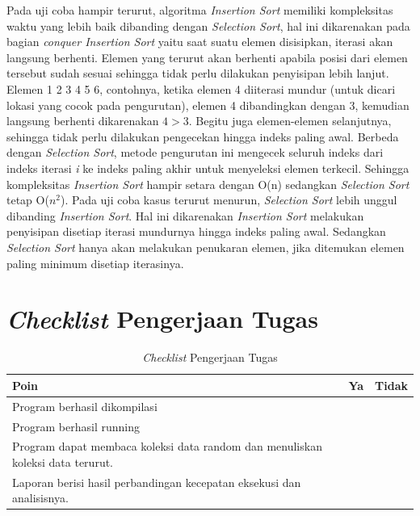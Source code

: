\documentclass{article}
\begin{document}
	\par Pada uji coba hampir terurut, algoritma \textit{Insertion Sort} memiliki kompleksitas waktu yang lebih baik dibanding dengan \textit{Selection Sort}, hal ini dikarenakan pada bagian \textit{conquer Insertion Sort} yaitu saat suatu elemen disisipkan, iterasi akan langsung berhenti. Elemen yang terurut akan berhenti apabila posisi dari elemen tersebut sudah sesuai sehingga tidak perlu dilakukan penyisipan lebih lanjut. Elemen 1 2 3 4 5 6, contohnya, ketika elemen 4 diiterasi mundur (untuk dicari lokasi yang cocok pada pengurutan), elemen 4 dibandingkan dengan 3, kemudian langsung berhenti dikarenakan $4>3$. Begitu juga elemen-elemen selanjutnya, sehingga tidak perlu dilakukan pengecekan hingga indeks paling awal. Berbeda dengan \textit{Selection Sort}, metode pengurutan ini mengecek seluruh indeks dari indeks iterasi \textit{i} ke indeks paling akhir untuk menyeleksi elemen terkecil. Sehingga kompleksitas \textit{Insertion Sort} hampir setara dengan O(n) sedangkan \textit{Selection Sort} tetap O($n^2$). Pada uji coba kasus terurut menurun, \textit{Selection Sort} lebih unggul dibanding \textit{Insertion Sort}. Hal ini dikarenakan \textit{Insertion Sort} melakukan penyisipan disetiap iterasi mundurnya hingga indeks paling awal. Sedangkan \textit{Selection Sort} hanya akan melakukan penukaran elemen, jika ditemukan elemen paling minimum disetiap iterasinya.
	
	
	
	\section{\textit{Checklist} Pengerjaan Tugas}
	\begin{table}[h]
		\caption{\textit{Checklist} Pengerjaan Tugas}
		\centering
		\begin{tabular}{|L|c|c|}
			\hline
			\centering Poin & Ya & Tidak \\
			\hline
			Program berhasil dikompilasi & \checkmark &  \\
			\hline
			Program berhasil running & \checkmark &  \\
			\hline
			Program dapat membaca koleksi data random dan menuliskan koleksi data terurut. & \checkmark &  \\
			\hline
			Laporan berisi hasil perbandingan kecepatan eksekusi dan analisisnya. & \checkmark &  \\
			\hline
		\end{tabular}
	\end{table}
\end{document}

